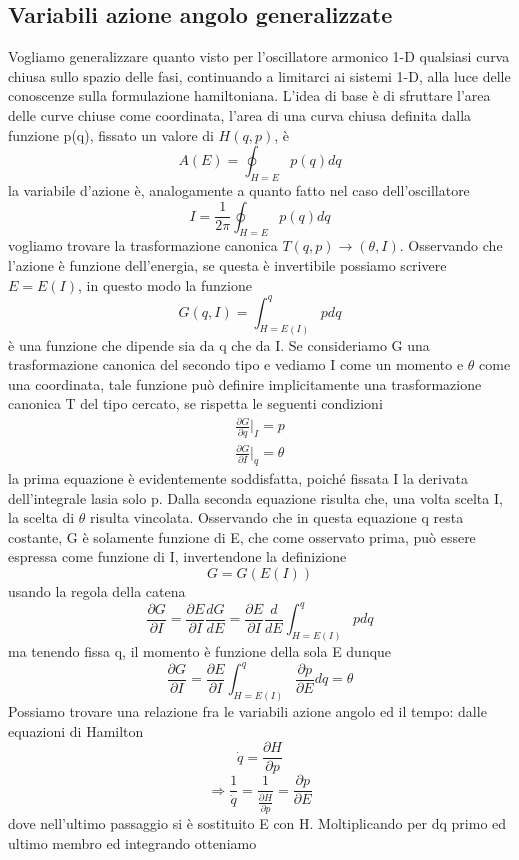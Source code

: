 \documentclass[
10pt, %
a4paper, %
oneside, %
headinclude,footinclude, %
BCOR5mm, %
]{scrartcl}
\begin{document}
\subsection{Variabili azione angolo generalizzate}
Vogliamo generalizzare quanto visto per l'oscillatore armonico 1-D qualsiasi curva chiusa sullo spazio delle fasi, continuando a limitarci ai sistemi 1-D, alla luce delle conoscenze sulla formulazione hamiltoniana. L'idea di base è di sfruttare l'area delle curve chiuse come coordinata, l'area di una curva chiusa definita dalla funzione p(q), fissato un valore di \(H(q, p)\), è
\[A(E) = \oint_{H = E}p(q)dq\]
la variabile d'azione è, analogamente a quanto fatto nel caso dell'oscillatore
\[I = \frac{1}{2\pi}\oint_{H = E}p(q)dq\]
vogliamo trovare la trasformazione canonica \(T(q, p)\rightarrow(\theta, I)\). Osservando che l'azione è funzione dell'energia, se questa è invertibile possiamo scrivere \(E = E(I)\), in questo modo la funzione
\[G(q, I) = \int_{H = E(I)}^qpdq\]
è una funzione che dipende sia da q che da I. Se consideriamo G una trasformazione canonica del secondo tipo e vediamo I come un momento e \(\theta\) come una coordinata, tale funzione può definire implicitamente una trasformazione canonica T del tipo cercato, se rispetta le seguenti condizioni
\begin{align*}
	\frac{\partial G}{\partial q}|_{I} =p\\
	\frac{\partial G}{\partial I}|_{q} = \theta
\end{align*}
la prima equazione è evidentemente soddisfatta, poiché fissata I la derivata dell'integrale lasia solo p. Dalla seconda equazione risulta che, una volta scelta I, la scelta di $\theta$ risulta vincolata. Osservando che in questa equazione q resta costante, G è solamente funzione di E, che come osservato prima, può essere espressa come funzione di I, invertendone la definizione
\[G = G(E(I))\]
usando la regola della catena
\[\frac{\partial G}{\partial I} = \frac{\partial E}{\partial I}\frac{d G}{d E} = \frac{\partial E}{\partial I}\frac{d}{dE}\int_{H = E(I)}^qpdq\]
ma tenendo fissa q, il momento è funzione della sola E dunque
\[\frac{\partial G}{\partial I} = \frac{\partial E}{\partial I}\int_{H = E(I)}^q\frac{\partial p}{\partial E}dq = \theta\]
Possiamo trovare una relazione fra le variabili azione angolo ed il tempo: dalle equazioni di Hamilton
\[\dot{q} = \frac{\partial H}{\partial p}\]
\[\Rightarrow \frac{1}{\dot{q}} = \frac{1}{\frac{\partial H}{\partial p}} = \frac{\partial p}{\partial E}\]
dove nell'ultimo passaggio si è sostituito E con H. Moltiplicando per dq primo ed ultimo membro ed integrando otteniamo 
\end{document}
